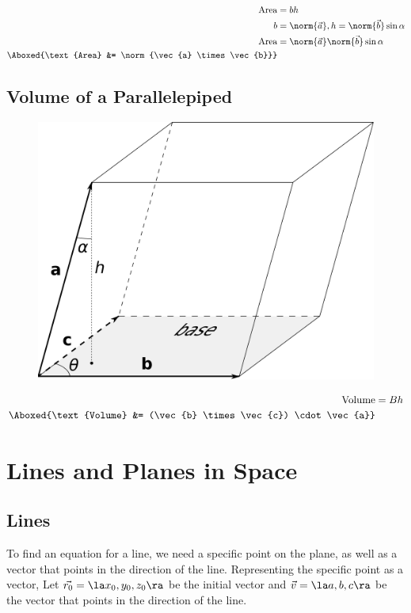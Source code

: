 \documentclass[12pt]{article}
\begin{document}
\[
\begin{aligned}
\text{Area} &= bh \\
b &= \norm{\vec{a}}, h = \norm{\vec{b}}\sin{\alpha} \\
\text{Area} &= \norm{\vec{a}}\norm{\vec{b}}\sin{\alpha} \\
\Aboxed{\text{Area} &= \norm{\vec{a} \times \vec{b}}}
\end{aligned}
\]
\newpage
\subsection{Volume of a Parallelepiped}

\begin{figure}[h!]
\centering
\includegraphics[scale=0.1]{box}
\end{figure}

\[
\begin{aligned}
\text{Volume} &= Bh \\ 
\Aboxed{\text{Volume} &= (\vec{b} \times \vec{c}) \cdot \vec{a}}
\end{aligned}
\]

\section{Lines and Planes in Space}
\subsection{Lines}
To find an equation for a line, we need a specific point on the plane, as well as a vector that points in the direction of the line. Representing the specific point as a vector, Let $\vec{r_0} = \la x_0,y_0,z_0 \ra$ be the initial vector and $\vec{v} = \la a,b,c \ra$ be the vector that points in the direction of the line.
\end{document}
